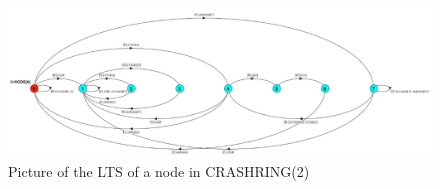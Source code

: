 \begin{figure}[!h]
  \centering
    \includegraphics[width=\textwidth]{crashring.jpeg}
    \caption{Picture of the LTS of a node in CRASHRING(2)}
\end{figure}

